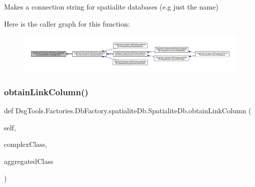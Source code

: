\begin{DoxyVerb}Makes a connection string for spatialite databases (e.g just the name)
\end{DoxyVerb}
 Here is the caller graph for this function\+:
\nopagebreak
\begin{figure}[H]
\begin{center}
\leavevmode
\includegraphics[width=350pt]{class_dsg_tools_1_1_factories_1_1_db_factory_1_1spatialite_db_1_1_spatialite_db_a90ac5680b7a302f0e6d99f21f7c48b40_icgraph}
\end{center}
\end{figure}
\mbox{\label{class_dsg_tools_1_1_factories_1_1_db_factory_1_1spatialite_db_1_1_spatialite_db_a2f32ac600aa67edab921aa6c4de83c40}} 
\subsubsection{\texorpdfstring{obtain\+Link\+Column()}{obtainLinkColumn()}}
{\footnotesize\ttfamily def Dsg\+Tools.\+Factories.\+Db\+Factory.\+spatialite\+Db.\+Spatialite\+Db.\+obtain\+Link\+Column (\begin{DoxyParamCaption}\item[{}]{self,  }\item[{}]{complex\+Class,  }\item[{}]{aggregated\+Class }\end{DoxyParamCaption})}

